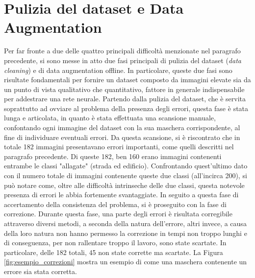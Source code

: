 \section{Pulizia del dataset e Data Augmentation}
\label{data_aug_used}
Per far fronte a due delle quattro principali difficoltà menzionate nel paragrafo precedente, si sono messe in atto due fasi principali di pulizia del dataset (\textit{data cleaning}) e di data augmentation offline.
In particolare, queste due fasi sono risultate fondamentali per fornire un dataset composto da immagini elevate sia da un punto di vista qualitativo che quantitativo, fattore in generale  indispensabile per addestrare una rete neurale.
Partendo dalla pulizia del dataset, che è servita soprattutto ad ovviare al problema della presenza degli errori, questa fase è stata lunga e articolata, in quanto è stata effettuata una scansione manuale, confontando ogni immagine del dataset con la sua maschera corrispondente, al fine di individuare eventuali errori. Da questa scansione, si è riscontrato che in totale 182 immagini presentavano errori importanti, come quelli descritti nel paragrafo precedente. Di queste 182, ben 160 erano immagini contenenti entrambe le classi "allagate" (strada ed edificio). Confrontando quest'ultimo dato con il numero totale di immagini contenente queste due classi (all'incirca 200), si può notare come, oltre alle difficoltà intrinseche delle due classi, questa notevole presenza di errori le abbia fortemente svantaggiate. In seguito a questa fase di accertamento della consistenza del problema, si è proseguito con la fase di correzione. Durante questa fase, una parte degli errori è risultata corregibile attraverso diversi metodi, a seconda della natura dell'errore, altri invece, a causa della loro natura non hanno permesso la correzione in tempi non troppo lunghi e di conseguenza, per non rallentare troppo il lavoro, sono state scartate. In particolare, delle 182 totali, 45  non state corrette ma scartate. La Figura \ref{fig:esempio_correzioni} mostra un esempio di come una maschera contenente un errore sia stata corretta.
\\


